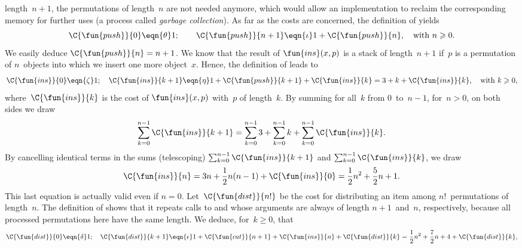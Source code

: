 length~\(n+1\), the permutations of length~\(n\) are not needed
anymore, which would allow an implementation to reclaim the
corresponding memory for further uses (a process called \emph{garbage
  collection}). As far as the costs are
concerned, the definition of  yields
\begin{equation*}
\C{\fun{push}}{0} \eqn{\theta} 1;\qquad
\C{\fun{push}}{n+1} \eqn{\iota} 1 + \C{\fun{push}}{n},\quad
\text{with \(n \geqslant 0\)}.
\end{equation*}
We easily deduce \(\C{\fun{push}}{n} = n +
1\). We know that the result of
\(\fun{ins}(x,p)\) is a stack of length~\(n+1\) if~\(p\) is a
permutation of \(n\)~objects into which we insert one more
object~\(x\). Hence, the definition of  leads to
\begin{equation*}
\C{\fun{ins}}{0}   \eqn{\zeta} 1;\quad
\C{\fun{ins}}{k+1} \eqn{\eta} 1 + \C{\fun{push}}{k+1} +
\C{\fun{ins}}{k} = 3 + k + \C{\fun{ins}}{k}, \quad \text{with \(k
                   \geqslant 0\)},
\end{equation*}
where~\(\C{\fun{ins}}{k}\) is the cost of \(\fun{ins}(x,p)\)
with~\(p\) of length~\(k\). By summing for all~\(k\) from
\(0\)~to~\(n-1\), for~\(n>0\), on both sides we draw
\begin{equation*}
\sum_{k=0}^{n-1}{\C{\fun{ins}}{k+1}}
  = \sum_{k=0}^{n-1}{3} + \sum_{k=0}^{n-1}{k}
     + \sum_{k=0}^{n-1}{\C{\fun{ins}}{k}}.
\end{equation*}
By cancelling identical terms in the sums (telescoping)
\(\sum_{k=0}^{n-1}{\C{\fun{ins}}{k+1}}\) and
\(\sum_{k=0}^{n-1}{\C{\fun{ins}}{k}}\), we draw
\begin{equation*}
\C{\fun{ins}}{n}
  = 3n + \frac{1}{2}n(n-1) + \C{\fun{ins}}{0}
  = \frac{1}{2}{n^2} + \frac{5}{2}{n} + 1.
\end{equation*}
This last equation is actually valid even if \(n =
0\). Let~\(\C{\fun{dist}}{n!}\) be the cost for distributing an item
among \(n!\)~permutations of length~\(n\). The definition of
 shows that it repeats calls to
 and
 whose arguments are always of
length \(n+1\)~and~\(n\), respectively, because all processed
permutations here have the same length. We deduce, for~\(k \geqslant
0\), that
\begin{equation*}
\C{\fun{dist}}{0} \eqn{\delta} 1;\quad
\C{\fun{dist}}{k+1}
  \eqn{\epsilon} 1 + \C{\fun{cat}}{n+1} + \C{\fun{ins}}{n}
                    + \C{\fun{dist}}{k}
  = \frac{1}{2}{n^2} + \frac{7}{2}{n} + 4 + \C{\fun{dist}}{k},
\end{equation*}
